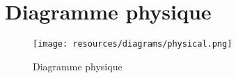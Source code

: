 \chapter{Diagramme physique}

\begin{landscape}
\begin{figure}
  \centering
  \texttt{[image: resources/diagrams/physical.png]}
  \caption{Diagramme physique}
\end{figure}
\end{landscape}

